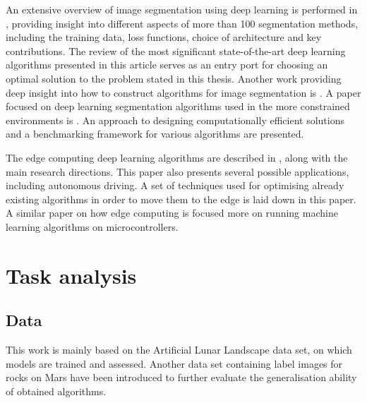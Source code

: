 \documentclass[a4paper,twoside,12pt]{book}
\begin{document}
An extensive overview of image segmentation using deep learning is performed in \cite{minaee2021image}, providing insight into different aspects of more than 100 segmentation methods, including the training data, loss functions, choice of architecture and key contributions. The review of the most significant state-of-the-art deep learning algorithms presented in this article serves as an entry port for choosing an optimal solution to the problem stated in this thesis. Another work providing deep insight into how to construct algorithms for image segmentation is \cite{ghosh2019understanding}. A paper focused on deep learning segmentation algorithms used in the more constrained environments is \cite{siam2018comparative}. An approach to designing computationally efficient solutions and a benchmarking framework for various algorithms are presented.

The edge computing deep learning algorithms are described in \cite{vestias2020moving}, along with the main research directions. This paper also presents several possible applications, including autonomous driving. A set of techniques used for optimising already existing algorithms in order to move them to the edge is laid down in this paper. A similar paper on how edge computing is \cite{merenda2020edge} focused more on running machine learning algorithms on microcontrollers.



\chapter{Task analysis}

\section{Data}
This work is mainly based on the Artificial Lunar Landscape data set, on which models are trained and assessed. Another data set containing label images for rocks on Mars have been introduced to further evaluate the generalisation ability of obtained algorithms.
\end{document}
